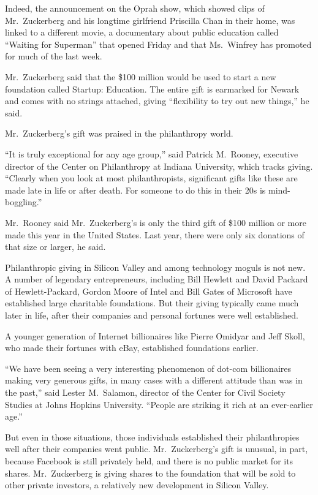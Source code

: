 ﻿\documentclass[12pt]{article}
\begin{document}
Indeed, the announcement on the Oprah show, which showed clips of Mr.~Zuckerberg and his longtime
girlfriend Priscilla Chan in their home, was linked to a different movie, a documentary about public
education called ``Waiting for Superman'' that opened Friday and that Ms.~Winfrey has promoted for
much of the last week.

Mr.~Zuckerberg said that the \$100 million would be used to start a new foundation called Startup:
Education. The entire gift is earmarked for Newark and comes with no strings attached, giving
``flexibility to try out new things,'' he said.

Mr.~Zuckerberg's gift was praised in the philanthropy world.

``It is truly exceptional for any age group,'' said Patrick M.~Rooney, executive director of the
Center on Philanthropy at Indiana University, which tracks giving. ``Clearly when you look at most
philanthropists, significant gifts like these are made late in life or after death. For someone to
do this in their 20s is mind-boggling.''

Mr.~Rooney said Mr.~Zuckerberg's is only the third gift of \$100 million or more made this year in
the United States. Last year, there were only six donations of that size or larger, he said.

Philanthropic giving in Silicon Valley and among technology moguls is not new. A number of legendary
entrepreneurs, including Bill Hewlett and David Packard of Hewlett-Packard, Gordon Moore of Intel
and Bill Gates of Microsoft have established large charitable foundations. But their giving
typically came much later in life, after their companies and personal fortunes were well
established.

A younger generation of Internet billionaires like Pierre Omidyar and Jeff Skoll, who made their
fortunes with eBay, established foundations earlier.

``We have been seeing a very interesting phenomenon of dot-com billionaires making very generous
gifts, in many cases with a different attitude than was in the past,'' said Lester M.~Salamon,
director of the Center for Civil Society Studies at Johns Hopkins University. ``People are striking
it rich at an ever-earlier age.''

But even in those situations, those individuals established their philanthropies well after their
companies went public. Mr.~Zuckerberg's gift is unusual, in part, because Facebook is still
privately held, and there is no public market for its shares. Mr.~Zuckerberg is giving shares to the
foundation that will be sold to other private investors, a relatively new development in Silicon
Valley.
\end{document}
